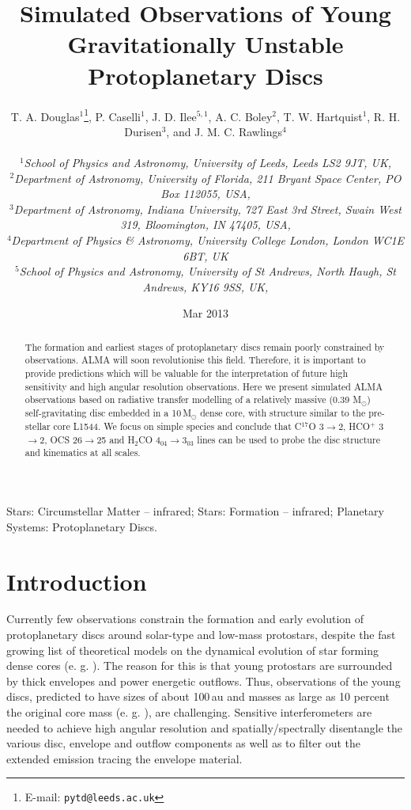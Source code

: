 \documentclass[useAMS,usenatbib]{mn2e}
\title[Young protoplanetary discs]{Simulated Observations of Young Gravitationally Unstable Protoplanetary Discs}
\author[T.~A.~Douglas et al.]
{\parbox{\textwidth}{T. A. Douglas$^{1}$\thanks{E-mail: \texttt{pytd@leeds.ac.uk}},
P. Caselli$^{1}$,
J. D. Ilee$^{5,1}$,
A. C. Boley$^{2}$,
T. W. Hartquist$^{1}$,
R. H. Durisen$^{3}$, and
J. M. C. Rawlings$^{4}$\\
\vspace{0.1cm}\\
{\small{\it$^{1}$School of Physics and Astronomy, University of Leeds, Leeds LS2 9JT, UK,}} \\
{\small{\it$^{2}$Department of Astronomy, University of Florida, 211 Bryant Space Center, PO Box 112055, USA,}}\\
{\small{\it$^{3}$Department of Astronomy, Indiana University, 727 East 3rd Street, Swain West 319, Bloomington, IN 47405, USA,}}\\
{\small{\it$^{4}$Department of Physics \& Astronomy, University College London, London WC1E 6BT, UK}}\\
{\small{\it$^{5}$School of Physics and Astronomy, University of St Andrews, North Haugh, St Andrews, KY16 9SS, UK,}}\\
}}
\begin{document}
\date{Mar 2013}

\pagerange{\pageref{firstpage}--\pageref{lastpage}} 

\maketitle

\label{firstpage}

\begin{abstract}
The formation and earliest stages of protoplanetary discs remain poorly constrained by observations. ALMA will soon revolutionise this field. Therefore, it is important to provide predictions which will be valuable for the interpretation of future high sensitivity and high angular resolution observations. Here we present simulated ALMA observations based on radiative transfer modelling of a relatively massive (0.39 M$_{\odot}$) self-gravitating disc embedded in a 10\,M$_{\odot}$ dense core, with structure similar to the pre-stellar core L1544. We focus on simple species and conclude that  C$^{17}$O 3$\rightarrow$2, HCO$^+$ 3$\rightarrow$2, OCS 26$\rightarrow$25 and H$_2$CO 4$_{04}\rightarrow$3$_{03}$ lines can be used to probe the disc structure and kinematics at all scales. 
\end{abstract}

\begin{keywords}
Stars: Circumstellar Matter -- infrared; Stars: Formation -- infrared; Planetary Systems: Protoplanetary Discs.
\end{keywords}

\section{Introduction}

Currently few observations constrain the formation and early evolution of protoplanetary discs around solar-type and low-mass protostars, despite the fast growing list of theoretical models on the dynamical evolution of star forming dense cores (e. g. \citealt{Krasnopolsky2011,Machida2011,Braiding2012,Joos2013}). The reason for this is that young protostars are surrounded by thick envelopes and power energetic outflows. Thus, observations of the young discs, predicted to have sizes of about 100\,au and masses as large as 10 percent the original core mass (e. g. \citealt{Joos2012,Hayfield2011,Machida2011}), are challenging. Sensitive interferometers are needed to achieve high angular resolution and spatially/spectrally disentangle the various disc, envelope and outflow components as well as to filter out the extended emission tracing the envelope material. \smallskip
\end{document}
